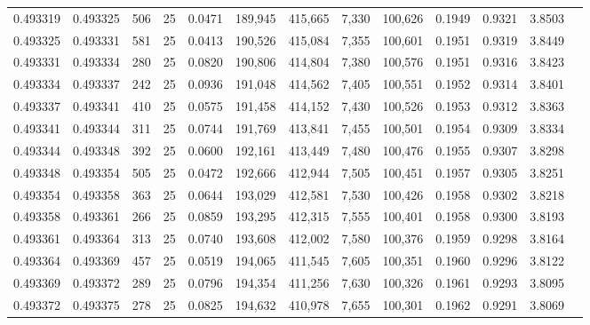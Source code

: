 \begin{tabular}{rrrrrrrrrrrrr}
0.493319 & 0.493325 &   506 &  25 &                                     0.0471 & 189,945 & 415,665 &   7,330 & 100,626 & 0.1949 & 0.9321 & 3.8503 \\
0.493325 & 0.493331 &   581 &  25 &                                     0.0413 & 190,526 & 415,084 &   7,355 & 100,601 & 0.1951 & 0.9319 & 3.8449 \\
0.493331 & 0.493334 &   280 &  25 &                                     0.0820 & 190,806 & 414,804 &   7,380 & 100,576 & 0.1951 & 0.9316 & 3.8423 \\
0.493334 & 0.493337 &   242 &  25 &                                     0.0936 & 191,048 & 414,562 &   7,405 & 100,551 & 0.1952 & 0.9314 & 3.8401 \\
0.493337 & 0.493341 &   410 &  25 &                                     0.0575 & 191,458 & 414,152 &   7,430 & 100,526 & 0.1953 & 0.9312 & 3.8363 \\
0.493341 & 0.493344 &   311 &  25 &                                     0.0744 & 191,769 & 413,841 &   7,455 & 100,501 & 0.1954 & 0.9309 & 3.8334 \\
0.493344 & 0.493348 &   392 &  25 &                                     0.0600 & 192,161 & 413,449 &   7,480 & 100,476 & 0.1955 & 0.9307 & 3.8298 \\
0.493348 & 0.493354 &   505 &  25 &                                     0.0472 & 192,666 & 412,944 &   7,505 & 100,451 & 0.1957 & 0.9305 & 3.8251 \\
0.493354 & 0.493358 &   363 &  25 &                                     0.0644 & 193,029 & 412,581 &   7,530 & 100,426 & 0.1958 & 0.9302 & 3.8218 \\
0.493358 & 0.493361 &   266 &  25 &                                     0.0859 & 193,295 & 412,315 &   7,555 & 100,401 & 0.1958 & 0.9300 & 3.8193 \\
0.493361 & 0.493364 &   313 &  25 &                                     0.0740 & 193,608 & 412,002 &   7,580 & 100,376 & 0.1959 & 0.9298 & 3.8164 \\
0.493364 & 0.493369 &   457 &  25 &                                     0.0519 & 194,065 & 411,545 &   7,605 & 100,351 & 0.1960 & 0.9296 & 3.8122 \\
0.493369 & 0.493372 &   289 &  25 &                                     0.0796 & 194,354 & 411,256 &   7,630 & 100,326 & 0.1961 & 0.9293 & 3.8095 \\
0.493372 & 0.493375 &   278 &  25 &                                     0.0825 & 194,632 & 410,978 &   7,655 & 100,301 & 0.1962 & 0.9291 & 3.8069 \\

\end{tabular}
